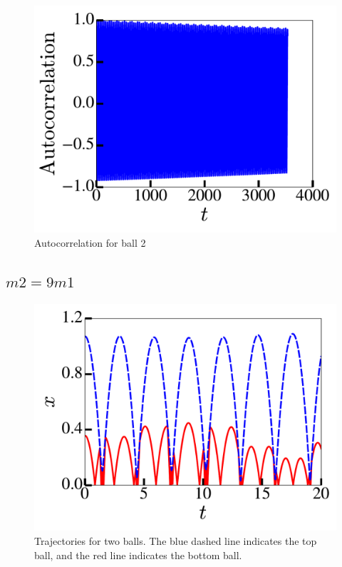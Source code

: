 \documentclass[pra,twocolumn,showpacs,amsmath,amssymb, aps, 10pt]{revtex4-1}
\begin{document}
\begin{figure}
  \includegraphics[width=0.8\linewidth]{r1_0_acorr}
  \caption{Autocorrelation for ball 2}
  \label{fig:1-acorr}
\end{figure}





\subsection{$m2 = 9 m1$}\label{sec:r9}
\begin{figure}
  \includegraphics[width=0.8\linewidth]{r0_1_traj}
  \caption{Trajectories for two balls. The blue dashed line indicates the top
  ball, and the red line indicates the bottom ball.}
  \label{fig:9-traj}
\end{figure}
\end{document}
